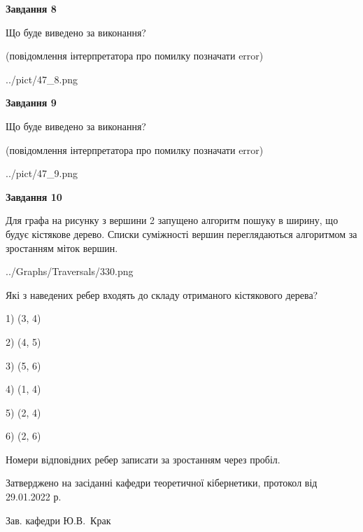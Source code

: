 \documentclass[12pt, ukrainian]{article}
\begin{document}
{\begin {large}
{\begin {center}\textbf{Завдання 8}\end {center}}\par
Що буде виведено за виконання?\par
 (повідомлення інтерпретатора про помилку позначати error)
\begin{center}
	{../pict/47_8.png}
\end{center}
\newpage

{\begin {center}\textbf{Завдання 9}\end {center}}\par
Що буде виведено за виконання?\par
 (повідомлення інтерпретатора про помилку позначати error)\par
\begin{center}
	{../pict/47_9.png}
\end{center}
\newpage

{\begin {center}\textbf{Завдання 10}\end {center}}\par
Для графа на рисунку з вершини 2 запущено алгоритм пошуку в ширину, що будує кістякове дерево. Списки суміжності вершин переглядаються алгоритмом за зростанням міток вершин.\par
\begin{center}
	{../Graphs/Traversals/330.png}
\end{center}
\par Які з наведених ребер входять до складу отриманого кістякового дерева?\par
1) (3, 4)\par
2) (4, 5)\par
3) (5, 6)\par
4) (1, 4)\par
5) (2, 4)\par
6) (2, 6)\par
{\vskip 15pt} Номери відповідних ребер записати за зростанням через пробіл.\par
\newpage


\end {large}
}
{\smallskip \begin {small} Затверджено на засіданні кафедри теоретичної кібернетики, протокол  від   29.01.2022 р.\par\smallskip\smallskip
{\parbox {6.5 cm}{Зав. кафедри \dotfill Ю.В.~Крак}} \end{small}}
\end{document}
